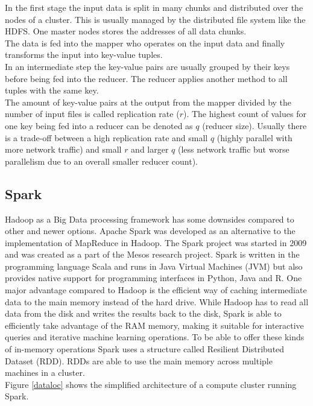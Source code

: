 \noindent In the first stage the input data is split in many chunks and distributed over the nodes of a cluster. This is usually managed by the distributed file system like the HDFS. One master nodes stores the addresses of all data chunks.\\
The data is fed into the mapper who operates on the input data and finally transforms the input into key-value tuples.\\
In an intermediate step the key-value pairs are usually grouped by their keys before being fed into the reducer. The reducer applies another method to all tuples with the same key.\\
The amount of key-value pairs at the output from the mapper divided by the number of input files is called replication rate ($r$). The highest count of values for one key being fed into a reducer can be denoted as $q$ (reducer size). Usually there is a trade-off between a high replication rate and small $q$ (highly parallel with more network traffic) and small $r$ and larger $q$ (less network traffic but worse parallelism due to an overall smaller reducer count).

\subsection{Spark}\label{sparksec}

Hadoop as a Big Data processing framework has some downsides compared to other and newer options. Apache Spark was developed as an alternative to the implementation of MapReduce in Hadoop. The Spark project was started in 2009 and was created as a part of the Mesos research project. Spark is written in the programming language Scala and runs in Java Virtual Machines (JVM) but also provides native support for programming interfaces in Python, Java and R. 
One major advantage compared to Hadoop is the efficient way of caching intermediate data to the main memory instead of the hard drive. While Hadoop has to read all data from the disk and writes the results back to the disk, Spark is able to efficiently take advantage of the RAM memory, making it suitable for interactive queries and iterative machine learning operations. To be able to offer these kinds of in-memory operations Spark uses a structure called Resilient Distributed Dataset (RDD). RDDs are able to use the main memory across multiple machines in a cluster. \cite[p. 13]{sparkbook1}\\ 
Figure \ref{dataloc} shows the simplified architecture of a compute cluster running Spark. 

